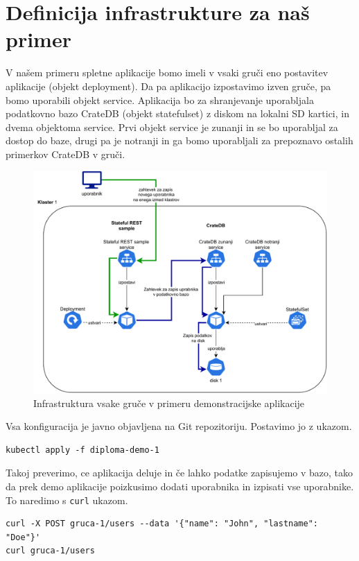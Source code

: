\documentclass[a4paper, 12pt]{book}
\begin{document}
\section{Definicija infrastrukture za naš primer}
V našem primeru spletne aplikacije bomo imeli v vsaki gruči eno postavitev aplikacije  (objekt deployment). 
Da pa aplikacijo izpostavimo izven gruče, pa bomo uporabili objekt service.
Aplikacija bo za shranjevanje uporabljala podatkovno bazo CrateDB (objekt statefulset) z diskom na lokalni SD kartici, in dvema objektoma service.
Prvi objekt service je zunanji in se bo uporabljal za dostop do baze, drugi pa je notranji in ga bomo uporabljali za prepoznavo ostalih primerkov CrateDB v gruči.
\begin{figure}[h]
\begin{center}
\includegraphics[width=1.0\textwidth]{images/infrastructure-example.pdf}
\end{center}
\caption{Infrastruktura vsake gruče v primeru demonstracijske aplikacije}
\label{primer-uporabe-helm-predloge-argo-cd}
\end{figure}
Vsa konfiguracija je javno objavljena na Git repozitoriju\cite{git-diploma}. Postavimo jo z ukazom.
\begin{verbatim}
kubectl apply -f diploma-demo-1
\end{verbatim}
  Takoj preverimo, ce aplikacija deluje in če lahko podatke zapisujemo v bazo, tako da prek demo aplikacije poizkusimo dodati uporabnika in izpisati vse uporabnike. To naredimo s \verb|curl| ukazom.
\begin{verbatim}
curl -X POST gruca-1/users --data '{"name": "John", "lastname": "Doe"}'
curl gruca-1/users
\end{verbatim}
\end{document}
